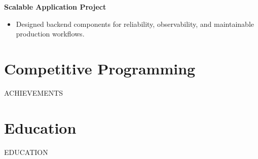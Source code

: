 \documentclass[10pt]{article}
\begin{document}
\textbf{Scalable Application Project}\\
\begin{itemize}
\item Designed backend components for reliability, observability, and maintainable production workflows.
\end{itemize}

\section*{Competitive Programming}
{{ACHIEVEMENTS}}

\section*{Education}
{{EDUCATION}}
\end{document}
